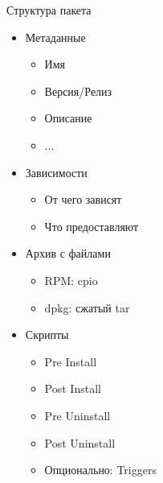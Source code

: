 \begin{frame}{Структура пакета}
	\begin{itemize}
		\item Метаданные
			\begin{itemize}
				\item Имя
				\item Версия/Релиз
				\item Описание
				\item ...
			\end{itemize}
		\item Зависимости
			\begin{itemize}
				\item От чего зависят
				\item Что предоставляют
			\end{itemize}
		\item Архив с файлами
			\begin{itemize}
				\item RPM: cpio
				\item dpkg: сжатый tar
			\end{itemize}
		\item Скрипты
			\begin{itemize}
				\item Pre Install
				\item Post Install
				\item Pre Uninstall
				\item Post Uninstall \bigskip
				\item Опционально: Triggers
			\end{itemize}
	\end{itemize}
\end{frame}

